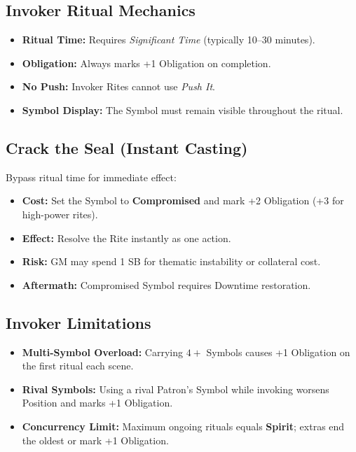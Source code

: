 \subsection{Invoker Ritual Mechanics}
\label{subsec:invoker-rituals}
\begin{itemize}
  \item \textbf{Ritual Time:} Requires \emph{Significant Time} (typically 10--30 minutes). 
  \item \textbf{Obligation:} Always marks +1 Obligation on completion.
  \item \textbf{No Push:} Invoker Rites cannot use \textit{Push It}.
  \item \textbf{Symbol Display:} The Symbol must remain visible throughout the ritual.
\end{itemize}

\subsection{Crack the Seal (Instant Casting)}
\label{subsec:crack-the-seal}
Bypass ritual time for immediate effect:
\begin{itemize}
  \item \textbf{Cost:} Set the Symbol to \textbf{Compromised} and mark +2 Obligation (+3 for high-power rites). 
  \item \textbf{Effect:} Resolve the Rite instantly as one action.
  \item \textbf{Risk:} GM may spend 1 SB for thematic instability or collateral cost.
  \item \textbf{Aftermath:} Compromised Symbol requires Downtime restoration.
\end{itemize}

\subsection{Invoker Limitations}
\label{subsec:invoker-limitations}
\begin{itemize}
  \item \textbf{Multi-Symbol Overload:} Carrying $4+$ Symbols causes +1 Obligation on the first ritual each scene.
  \item \textbf{Rival Symbols:} Using a rival Patron's Symbol while invoking worsens Position and marks +1 Obligation. 
  \item \textbf{Concurrency Limit:} Maximum ongoing rituals equals \textbf{Spirit}; extras end the oldest or mark +1 Obligation.
\end{itemize}

